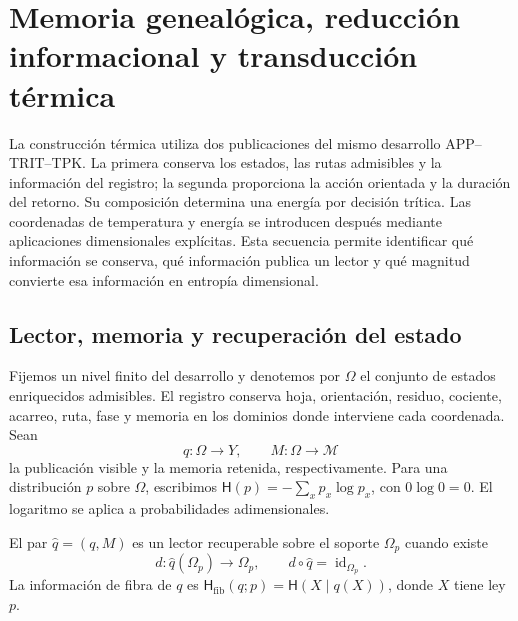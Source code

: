 
\section{Memoria genealógica, reducción informacional y transducción térmica}
\label{v:ant:sec:ii-kb-aut-desarrollo}

La construcción térmica utiliza dos publicaciones del mismo desarrollo
APP--TRIT--TPK. La primera conserva los estados, las rutas admisibles y
la información del registro; la segunda proporciona la acción orientada
y la duración del retorno. Su composición determina una energía por
decisión trítica. Las coordenadas de temperatura y energía se introducen
después mediante aplicaciones dimensionales explícitas. Esta secuencia
permite identificar qué información se conserva, qué información publica
un lector y qué magnitud convierte esa información en entropía dimensional.

\subsection{Lector, memoria y recuperación del estado}

Fijemos un nivel finito del desarrollo y denotemos por \(\Omega\) el
conjunto de estados enriquecidos admisibles. El registro conserva hoja,
orientación, residuo, cociente, acarreo, ruta, fase y memoria en los
dominios donde interviene cada coordenada. Sean
\[
 q:\Omega\longrightarrow Y,\qquad
 M:\Omega\longrightarrow\mathcal M
\]
la publicación visible y la memoria retenida, respectivamente. Para una
distribución \(p\) sobre \(\Omega\), escribimos
\(\mathsf H(p)=-\sum_xp_x\log p_x\), con \(0\log0=0\).
El logaritmo se aplica a probabilidades adimensionales.

\begin{definition}
El par \(\widehat q=(q,M)\) es un lector recuperable sobre el soporte
\(\Omega_p\) cuando existe
\[
 d:\widehat q(\Omega_p)\longrightarrow\Omega_p,
 \qquad d\circ\widehat q=\operatorname{id}_{\Omega_p}.
\]
La información de fibra de \(q\) es
\(\mathsf H_{\mathrm{fib}}(q;p)=\mathsf H(X\mid q(X))\), donde
\(X\) tiene ley \(p\).
\end{definition}

